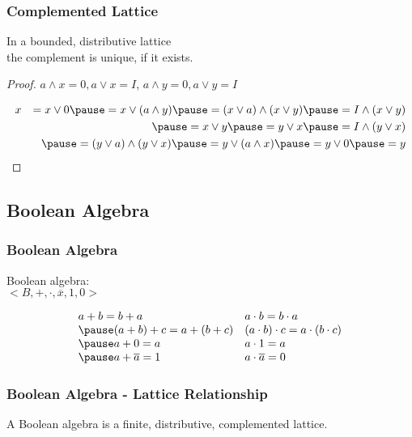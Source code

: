 \documentclass[dvipsnames]{beamer}
\begin{document}
\begin{frame}
  \frametitle{Complemented Lattice}

  \begin{theorem}
    In a bounded, distributive lattice\\
    the complement is unique, if it exists.
  \end{theorem}

  \pause
  \begin{proof}
    $a \wedge x = 0, a \vee x = I$, $a \wedge y = 0, a \vee y = I$

    \pause
    \medskip
    \begin{eqnarray*}
  & x & = x \vee 0 \pause = x \vee (a \wedge y) \pause = (x \vee a) \wedge (x \vee y) \pause = I \wedge (x \vee y)\\
  &   & \pause = x \vee y \pause = y \vee x \pause = I \wedge (y \vee x)\\
  &   & \pause = (y \vee a) \wedge (y \vee x) \pause = y \vee (a \wedge x) \pause = y \vee 0 \pause = y\\
    \end{eqnarray*}
  \end{proof}
\end{frame}

\subsection{Boolean Algebra}

\begin{frame}
  \frametitle{Boolean Algebra}

  \begin{definition}
    \alert{Boolean algebra}:\\
    $<B,+,\cdot,\overline{x},1,0>$

    \pause
    \[\begin{array}{ll}
      a + b = b + a &
      a \cdot b = b \cdot a\\ \pause
      (a + b) + c = a + (b + c) &
      (a \cdot b) \cdot c = a \cdot (b \cdot c)\\ \pause
      a + 0 = a &
      a \cdot 1 = a\\ \pause
      a + \overline{a} = 1 &
      a \cdot \overline{a} = 0
    \end{array}\]
  \end{definition}
\end{frame}

\begin{frame}
  \frametitle{Boolean Algebra - Lattice Relationship}

  \begin{definition}
    A Boolean algebra is a finite, distributive, complemented lattice.
  \end{definition}
\end{frame}
\end{document}
